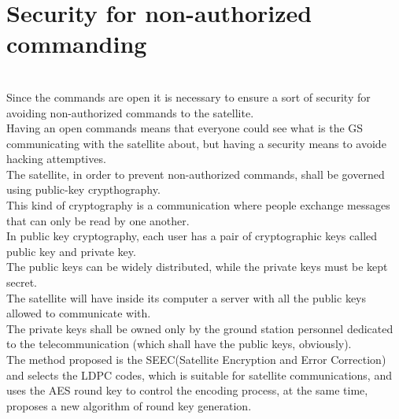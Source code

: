 \documentclass[a4paper,12pt]{article}
\begin{document}
\section*{Security for non-authorized commanding}
\
\\
Since the commands are open it is necessary to ensure a sort of security for avoiding non-authorized commands to the satellite.
\\
Having an open commands means that everyone could see what is the GS communicating with the satellite about, but having a security means to avoide hacking attemptives.
\\
The satellite, in order to prevent non-authorized commands, shall be governed using public-key crypthography.
\\
This kind of cryptography is a communication where people exchange messages that can only be read by one another.
\\
In public key cryptography, each user has a pair of cryptographic keys called public key and private key.
\\
The public keys can be widely distributed, while the private keys must be kept secret.
\\
The satellite will have inside its computer a server with all the public keys allowed to communicate with.
\\
The private keys shall be owned only by the ground station personnel dedicated to the telecommunication (which shall have the public keys, obviously).
\\
The method proposed is the  SEEC(Satellite Encryption and
Error Correction) and selects the
LDPC codes, which is suitable for satellite
communications, and uses the AES round key
to control the encoding process, at the same
time, proposes a new algorithm of round key
generation.
\end{document}
